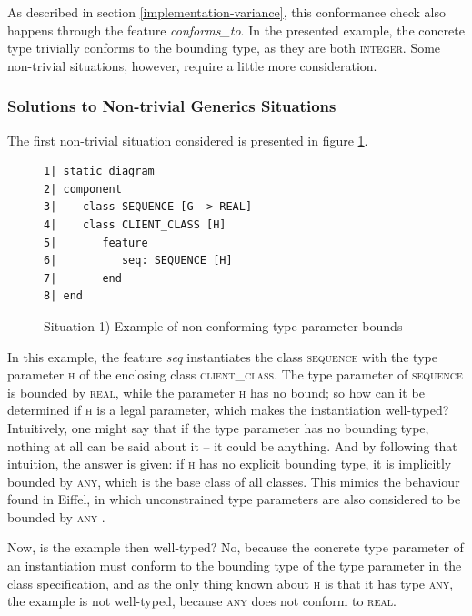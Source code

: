 As described in section \ref{implementation-variance}, this conformance check also happens through the feature \textit{conforms\_to}. In the presented example, the concrete type trivially conforms to the bounding type, as they are both \textsc{integer}. Some non-trivial situations, however, require a little more consideration.
\subsubsection{Solutions to Non-trivial Generics Situations}
The first non-trivial situation considered is presented in figure \ref{fig:non_conforming_type_bounds}.
\begin{figure}[H]
{\footnotesize
\begin{verbatim}
1| static_diagram
2| component
3|    class SEQUENCE [G -> REAL]
4|    class CLIENT_CLASS [H]
5|       feature
6|          seq: SEQUENCE [H]
7|       end
8| end
\end{verbatim}
}
\caption{Situation 1) Example of non-conforming type parameter bounds}
\label{fig:non_conforming_type_bounds}
\end{figure}
In this example, the feature \textit{seq} instantiates the class \textsc{sequence} with the type parameter \textsc{h} of the enclosing class \textsc{client\_class}. The type parameter of \textsc{sequence} is bounded by \textsc{real}, while the parameter \textsc{h} has no bound; so how can it be determined if \textsc{h} is a legal parameter, which makes the instantiation well-typed? Intuitively, one might say that if the type parameter has no bounding type, nothing at all can be said about it -- it could be anything. And by following that intuition, the answer is given: if \textsc{h} has no explicit bounding type, it is implicitly bounded by \textsc{any}, which is the base class of all classes. This mimics the behaviour found in Eiffel, in which unconstrained type parameters are also considered to be bounded by \textsc{any} \cite[p.~77]{meyer2001}.

Now, is the example then well-typed? No, because the concrete type parameter of an instantiation must conform to the bounding type of the type parameter in the class specification, and as the only thing known about \textsc{h} is that it has type \textsc{any}, the example is not well-typed, because \textsc{any} does not conform to \textsc{real}.
